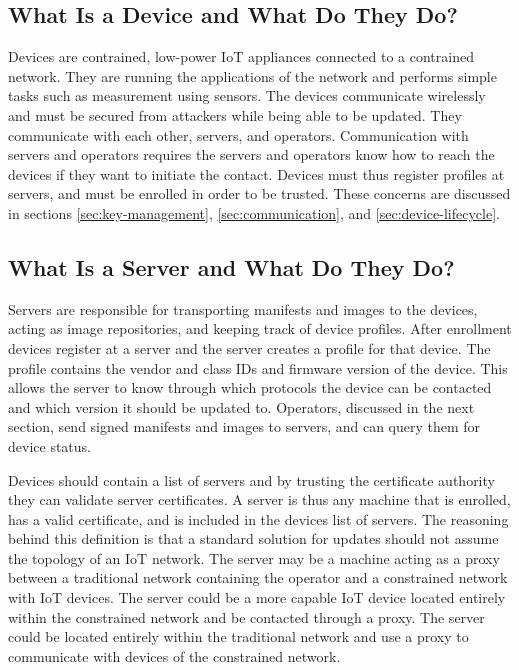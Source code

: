 \documentclass[0-thesis.tex]{subfiles}
\begin{document}
\subsection{What Is a Device and What Do They Do?}
\label{ssec:what-is-a-device}
Devices are contrained, low-power IoT appliances connected to a contrained network. They
are running the applications of the network and performs simple tasks such as measurement
using sensors. The devices communicate wirelessly and must be secured from attackers while
being able to be updated. They communicate with each other, servers, and operators.
Communication with servers and operators requires the servers and operators know how to
reach the devices if they want to initiate the contact. Devices must thus register
profiles at servers, and must be enrolled in order to be trusted. These concerns are
discussed in sections \ref{sec:key-management}, \ref{sec:communication}, and
\ref{sec:device-lifecycle}.

\subsection{What Is a Server and What Do They Do?}
\label{ssec:what-is-a-server}
Servers are responsible for transporting manifests and images to the devices, acting as
image repositories, and keeping track of device profiles. After enrollment devices
register at a server and the server creates a profile for that device. The profile
contains the vendor and class IDs and firmware version of the device. This allows the
server to know through which protocols the device can be contacted and which version it
should be updated to. Operators, discussed in the next section, send signed manifests and
images to servers, and can query them for device status.

Devices should contain a list of servers and by trusting the certificate authority they
can validate server certificates. A server is thus any machine that is enrolled, has a
valid certificate, and is included in the devices list of servers. The reasoning behind
this definition is that a standard solution for updates should not assume the topology of
an IoT network. The server may be a machine acting as a proxy between a traditional
network containing the operator and a constrained network with IoT devices. The server
could be a more capable IoT device located entirely within the constrained network and be
contacted through a proxy. The server could be located entirely within the traditional
network and use a proxy to communicate with devices of the constrained network.
\end{document}
